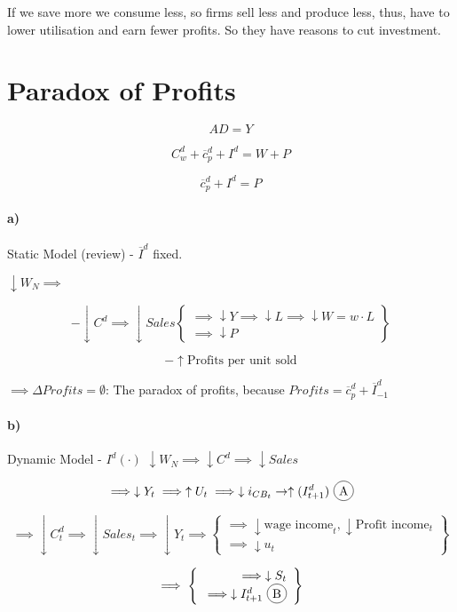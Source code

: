 \documentclass{report}
\newcommand*\circled[1]{\tikz[baseline=(char.base)]{
            \node[shape=circle,draw,inner sep=2pt] (char) {#1};}}
\begin{document}
If we save more we consume less, so firms sell less and produce less, thus, have to lower utilisation and earn fewer profits. So they have reasons to cut investment. 

\section{Paradox of Profits}

$$AD=Y$$

$$C_w^d+\overline{c}^d_p+I^d=W+P$$

$$\overline{c}^d_p+I^d=P$$

\paragraph{a)} Static Model (review) - $\overline{I}^d$ fixed. 

$\downarrow W_N \implies$

$$-\downarrow C^d \implies \downarrow Sales \left\{\begin{array}{r}
   \implies \downarrow Y \implies \downarrow L \implies \downarrow W=w\cdot L\\
   \implies \downarrow P
\end{array} \right\}$$

$$-\uparrow \text{Profits per unit sold}$$

$\implies \Delta Profits=\emptyset$: The paradox of profits, because $Profits=\overline{c}^d_p+\overline{I}^d_{-1}$

\paragraph{b)} Dynamic Model - $I^d(\cdot)$
$\downarrow W_N \implies \downarrow C^d \implies \downarrow Sales$



$$\implies \downarrow Y_t \implies \uparrow U_t \implies \downarrow i_{CB_t} \rightarrow \uparrow (I^d_{t+1})\text{  \circled{A}}$$

$$\implies \downarrow C^d_t \implies \downarrow Sales_t \implies \downarrow Y_t\implies \left\{\begin{array}{r}
\implies\downarrow \text{wage income}_{t}, \downarrow \text{Profit income}_t \\
\implies \downarrow u_t \end{array} \right\}$$
 
 $$  \implies \left\{\begin{array}{r}
     \implies \downarrow S_t  \\
      \implies \downarrow I^d_{t+1} \text{ \circled{B}}
\end{array} \right\}$$
\end{document}
